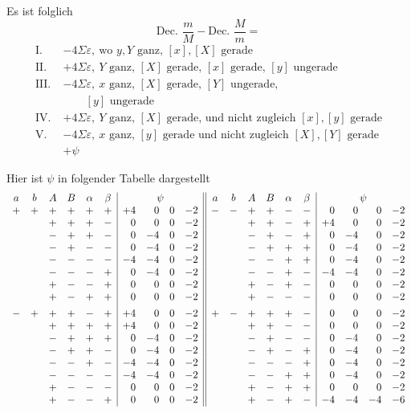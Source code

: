 %
Es ist folglich
\[
\text{Dec. }\frac mM-\text{Dec. }\frac Mm=
\]
\[
\begin{aligned}
\mathrm{I.}\;&-4\Sigma\varepsilon,\ \text{wo }y,Y\text{ ganz, }[x],[X]\text{ gerade}\\
\mathrm{II.}\;&+4\Sigma\varepsilon,\ Y\text{ ganz, }[X]\text{ gerade, }[x]\text{ gerade, }[y]\text{ ungerade}\\
\mathrm{III.}\;&-4\Sigma\varepsilon,\ x\text{ ganz, }[X]\text{ gerade, }[Y]\text{ ungerade,}\\
&\qquad [y]\text{ ungerade}\\
\mathrm{IV.}\;&+4\Sigma\varepsilon,\ Y\text{ ganz, }[X]\text{ gerade, und nicht zugleich }[x],[y]\text{ gerade}\\
\mathrm{V.}\;&-4\Sigma\varepsilon,\ x\text{ ganz, }[y]\text{ gerade und nicht zugleich }[X],[Y]\text{ gerade}\\
&+\psi
\end{aligned}
\]

Hier ist $\psi$ in folgender Tabelle dargestellt
\begingroup\small\setlength{\arraycolsep}{1.8pt}
\[
\begin{array}{cccccc|rrrr||cccccc|rrrr}
a&b&A&B&\alpha&\beta&\multicolumn{4}{c||}{\psi}&a&b&A&B&\alpha&\beta&\multicolumn{4}{c}{\psi}\\
+&+&+&+&+&+&+4&0&0&-2&-&-&+&+&-&-&0&0&0&-2\\
&&+&+&+&-&0&0&0&-2&&&+&+&-&+&+4&0&0&-2\\
&&-&+&+&-&0&-4&0&-2&&&-&+&-&+&0&-4&0&-2\\
&&-&+&-&-&0&-4&0&-2&&&-&+&+&+&0&-4&0&-2\\
&&-&-&-&-&-4&-4&0&-2&&&-&-&+&+&0&-4&0&-2\\
&&-&-&-&+&0&-4&0&-2&&&-&-&+&-&-4&-4&0&-2\\
&&+&-&-&+&0&0&0&-2&&&+&-&+&-&0&0&0&-2\\
&&+&-&+&+&0&0&0&-2&&&+&-&-&-&0&0&0&-2\\[4pt]
-&+&+&+&-&+&+4&0&0&-2&+&-&+&+&+&-&0&0&0&-2\\
&&+&+&+&+&+4&0&0&-2&&&+&+&-&-&0&0&0&-2\\
&&-&+&+&+&0&-4&0&-2&&&-&+&-&-&0&-4&0&-2\\
&&-&+&+&-&0&-4&0&-2&&&-&+&-&+&0&-4&0&-2\\
&&-&-&+&-&-4&-4&0&-2&&&-&-&-&+&0&-4&0&-2\\
&&-&-&-&-&-4&-4&0&-2&&&-&-&+&+&0&-4&0&-2\\
&&+&-&-&-&0&0&0&-2&&&+&-&+&+&0&0&0&-2\\
&&+&-&-&+&0&0&0&-2&&&+&-&+&-&-4&-4&-4&-6\\
\end{array}
\]
\endgroup

